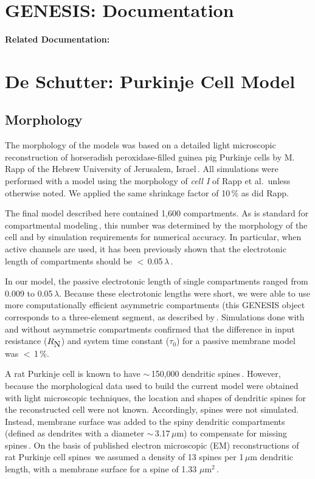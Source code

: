 \documentclass[12pt]{article}
\begin{document}
\section*{GENESIS: Documentation}

{\bf Related Documentation:}

\section*{De Schutter: Purkinje Cell Model}

\subsection*{Morphology}

The morphology of the models was based on a detailed light
microscopic reconstruction of horseradish peroxidase-filled
guinea pig Purkinje cells by M. Rapp of the Hebrew University of
Jerusalem, Israel\,\cite{Rapp-M:1992kx, Rapp-P:1994qf}. All simulations were
performed with a model using the morphology of {\it cell I} of Rapp et
al.\,\cite{Rapp-P:1994qf} unless otherwise noted. We applied the same shrinkage
factor of 10\,\% as did Rapp.

The final model described here contained 1,600 compartments.
As is standard for compartmental modeling\,\cite{rall62:_theor, W:1964oq},
this number was determined by the morphology of the cell and by
simulation requirements for numerical accuracy. In particular,
when active channels are used, it has been previously shown that
the electrotonic length of compartments should be $<$\,0.05\,$\lambda$\,\cite{W:1966ve}.

In our model, the passive electrotonic length of single compartments
ranged from 0.009 to 0.05\,$\lambda$. Because these electrotonic
lengths were short, we were able to use more computationally
efficient asymmetric compartments (this GENESIS object corresponds
to a three-element segment, as described by\,\cite{Segev-I:1985kl}. 
Simulations done with and without asymmetric compartments
confirmed that the difference in input resistance ($R_{\mbox N}$) and
system time constant ($\tau_0$) for a passive membrane model was
$<$\,1\,\%.

A rat Purkinje cell is known to have $\sim$\,150,000 dendritic spines\,\cite{Harvey:1991xz}. 
However, because the morphological
data used to build the current model were obtained with light
microscopic techniques, the location and shapes of dendritic
spines for the reconstructed cell were not known. Accordingly,
spines were not simulated. Instead, membrane surface was added
to the spiny dendritic compartments (defined as dendrites with a
diameter $\sim$\,3.17\,$\mu$m) to compensate for missing 
spines\,\cite{R:1989cr, Rapp-M:1992kx}. On the basis of published
electron microscopic (EM) reconstructions of rat Purkinje cell
spines\,\cite{M:1988bh} we assumed a density of 13
spines per 1\,$\mu$m dendritic length, with a membrane surface for a
spine of 1.33 $\mu$m$^2$\,\cite{M:1988bh}.



\end{document}
